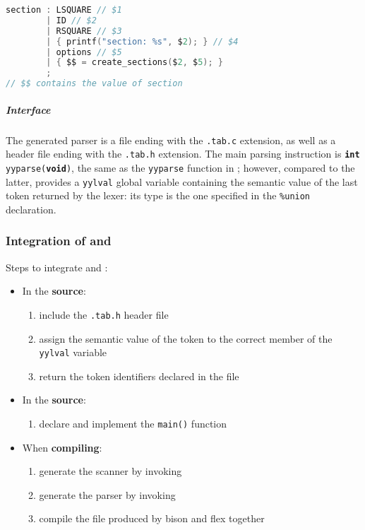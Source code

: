 \documentclass[english]{article}
\begin{document}
\begin{lstlisting}[language=C, mathescape=false, caption={Semantic value usage}, label={lst:bison-semantic-value-usage}]
section : LSQUARE // $1
        | ID // $2
        | RSQUARE // $3
        | { printf("section: %s", $2); } // $4
        | options // $5
        | { $$ = create_sections($2, $5); }
        ;
// $$ contains the value of section
\end{lstlisting}

\subparagraph*{Interface}

The generated parser is a \clang file ending with the \texttt{.tab.c} extension, as well as a header file ending with the \texttt{.tab.h} extension.
The main parsing instruction is \texttt{\textbf{int} yyparse(\textbf{void})}, the same as the \texttt{yyparse} function in \flex;
however, compared to the latter, \bison provides a \texttt{yylval} global variable containing the semantic value of the last token returned by the lexer:
its type is the one specified in the \texttt{\%union} declaration.

\subsubsection{Integration of \flex and \bison}

Steps to integrate \flex and \bison:

\begin{itemize}
  \item In the \textbf{\flex source}:
        \begin{enumerate}[series=flex-bison-enum, label=step \arabic*., ref=(step \arabic*), leftmargin=*, labelindent=2em, widest*=6]
          \item include the \texttt{.tab.h} header file
          \item assign the semantic value of the token to the correct member of the \texttt{yylval} variable
          \item return the token identifiers declared in the \bison file
        \end{enumerate}
  \item In the \textbf{\bison source}:
        \begin{enumerate}[resume*=flex-bison-enum]
          \item declare and implement the \texttt{main()} function
        \end{enumerate}
  \item When \textbf{compiling}:
        \begin{enumerate}[resume*=flex-bison-enum]
          \item\label{enum:flex-bison-command-1} generate the \flex scanner by invoking \flex
          \item\label{enum:flex-bison-command-2} generate the \bison parser by invoking \bison
          \item\label{enum:flex-bison-command-3} compile the \clang file produced by bison and flex together
        \end{enumerate}
\end{itemize}
\end{document}

